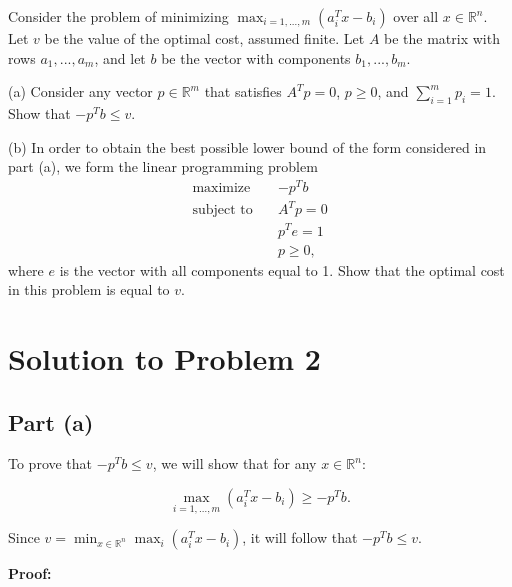 \documentclass{article}
\begin{document}
Consider the problem of minimizing $\max_{i=1,...,m}(a_i^T x - b_i)$ over all $x \in \mathbb{R}^n$. Let $v$ be the value of the optimal cost, assumed finite. Let $A$ be the matrix with rows $a_1, ..., a_m$, and let $b$ be the vector with components $b_1, ..., b_m$.

(a) Consider any vector $p \in \mathbb{R}^m$ that satisfies $A^T p = 0$, $p \geq 0$, and $\sum_{i=1}^m p_i = 1$. Show that $-p^T b \leq v$.

(b) In order to obtain the best possible lower bound of the form considered in part (a), we form the linear programming problem
\begin{align*}
\text{maximize} \quad & -p^T b \\
\text{subject to} \quad & A^T p = 0 \\
& p^T e = 1 \\
& p \geq 0,
\end{align*}
where $e$ is the vector with all components equal to 1. Show that the optimal cost in this problem is equal to $v$.

\section{Solution to Problem 2}

\subsection{Part (a)}

To prove that $-p^T b \leq v$, we will show that for any $x \in \mathbb{R}^n$:

\[
\max_{i=1,\dots,m}(a_i^T x - b_i) \geq -p^T b.
\]

Since $v = \min_{x \in \mathbb{R}^n} \max_{i}(a_i^T x - b_i)$, it will follow that $-p^T b \leq v$.

\textbf{Proof:}
\end{document}
